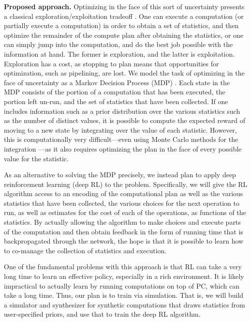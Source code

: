 \vspace{5 pt} 
\noindent
\textbf{Proposed approach.}
Optimizing in the face of this sort of uncertainty presents a classical exploration/exploitation tradeoff \cite{kocsis2006bandit}. 
One can  
execute a computation (or partially execute a computation) in order to obtain a set of statistics, and then optimize the 
remainder of the compute plan after obtaining the
statistics, or one can simply jump into the computation, and do the best job possible with the information at hand.  The former is
exploration, and the latter is exploitation.  Exploration has a cost, as stopping to plan means that opportunities for optimization,
such as pipelining, are lost.  We model the task of optimizing in the face of uncertainty as a 
Markov Decision Process (MDP) \cite{cassandra1998exact, white1991survey}.  Each state in the MDP consists of the portion of a computation that has been executed, the portion
left un-run, and the set of statistics that have been collected.  If one includes information such as a prior distribution over
the various statistics such as the number of distinct values, it is possible to compute the expected reward of moving to a new state 
by integrating over the value of each statistic.  However, this is computationally very difficult---even using Monte Carlo methods for
the integration \cite{littman1995complexity}---as it also requires optimizing the plan in the face of every possible value for the statistic.

As an alternative to solving the MDP precisely, we instead plan to apply deep reinforcement learning (deep RL) \cite{mnih2015human, lillicrap2015continuous, mnih2013playing} to the problem.  
Specifically, we will give the RL algorithm access to an encoding of the computational plan as well as the various statistics that
have been collected, the various choices for the next operation to run, as well as estimates for the cost of each of the operations,
as functions of the statistics.  By actually allowing the algorithm to make choices and execute parts of the computation and
then obtain feedback in the form of running time that is backpropagated through the network, the hope is that it is possible to
learn how to co-manage the collection of statistics and execution.

One of the fundamental problems with this approach is that RL can take a very long time to learn an effective policy, especially
in a rich environment.  It is likely impractical to actually learn
by running computations on top of PC, which can take a long time. 
Thus, our plan is to train
via 
simulation.  That is, we will build a simulator and synthesizer for synthetic computations that draws statistics from user-specified
priors, and use that to train the deep RL algorithm.


